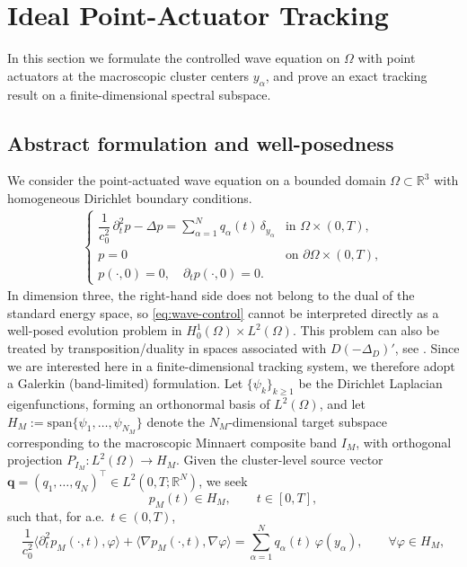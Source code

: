 \documentclass[11pt,a4paper]{article}
\numberwithin{equation}{section}
\begin{document}
\section{Ideal Point-Actuator Tracking}
\label{sec:abstract-wave}
\noindent
In this section we formulate the controlled wave equation on $\Omega$ with point actuators at the macroscopic cluster centers $y_\alpha$, and prove an exact tracking result on a finite-dimensional spectral subspace. 

\subsection{Abstract formulation and well-posedness}
\noindent
We consider the point-actuated wave equation on a bounded domain $\Omega\subset\mathbb{R}^3$
with homogeneous Dirichlet boundary conditions. 
\begin{align}\label{eq:wave-control}
    \begin{cases}
        \dfrac{1}{c_0^2}\,\partial_t^2 p - \Delta p = \displaystyle\sum_{\alpha=1}^N q_\alpha(t)\,\delta_{y_\alpha}
        & \text{in }\Omega\times(0,T),\\
        p = 0 & \text{on }\partial\Omega\times(0,T),\\
        p(\cdot,0)=0,\quad \partial_t p(\cdot,0)=0.
    \end{cases}
\end{align}
In dimension three, the right-hand side does not belong to the dual of the standard energy space,
so \eqref{eq:wave-control} cannot be interpreted directly as a well-posed evolution problem in
$H^1_0(\Omega)\times L^2(\Omega)$. This problem can also be treated by transposition/duality in spaces associated with $D(-\Delta_D)'$, see \cite{KunischRodriguesWalter,MichielsNiculescu,TucsnakWeissBook}. Since we are interested here in a finite-dimensional tracking system, we therefore adopt a Galerkin (band-limited) formulation.
\newline
Let $\{\psi_k\}_{k\ge1}$ be the Dirichlet Laplacian eigenfunctions, forming an orthonormal basis of $L^2(\Omega)$, and let $H_M := \mathrm{span}\{\psi_1,\dots,\psi_{N_M}\}$ denote the $N_M$-dimensional target subspace corresponding to the macroscopic Minnaert composite band $I_M$, with orthogonal projection $P_{I_M} : L^2(\Omega)\to H_M$. Given the cluster-level source vector $\mathbf q=(q_1,\dots,q_N)^\top\in L^2(0,T;\mathbb R^N)$, we seek
\[
p_M(t)\in H_M,\qquad t\in[0,T],
\]
such that, for a.e.\ $t\in(0,T)$,
\begin{equation}
\label{eq:galerkin-weak}
 \frac{1}{c_0^2}\langle \partial_t^2 p_M(\cdot,t), \varphi\rangle
 + \langle \nabla p_M(\cdot,t), \nabla \varphi\rangle
 = \sum_{\alpha=1}^N q_\alpha(t)\,\varphi(y_\alpha),
 \qquad \forall \varphi\in H_M,
\end{equation}
\end{document}
